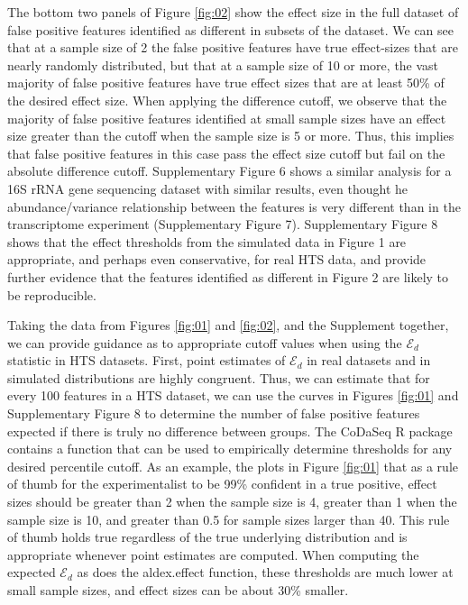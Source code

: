The bottom two panels of Figure \ref{fig:02} show the effect size in the full dataset of false positive features identified as different in subsets of the dataset. We can see that at a sample size of 2 the false positive features have true effect-sizes that are nearly randomly distributed, but that at a sample size of 10 or more, the vast majority of false positive features have true effect sizes that are at least 50\% of the desired effect size. When applying the difference cutoff, we observe that the majority of false positive features identified at small sample sizes have an effect size greater than the cutoff when the sample size is 5 or more. Thus, this implies that false positive features in this case pass the effect size cutoff but fail on the absolute difference cutoff. Supplementary Figure 6 shows a similar analysis for a 16S rRNA gene sequencing dataset \citep{bian:2017} with similar results, even thought he abundance/variance relationship between the features is very different than in the transcriptome experiment (Supplementary Figure 7). Supplementary Figure 8 shows that the effect thresholds from the simulated data in Figure 1 are appropriate, and perhaps even conservative, for real HTS data, and provide further evidence that the features identified as different in Figure 2 are likely to be reproducible.

Taking the data from Figures \ref{fig:01} and \ref{fig:02}, and the Supplement together, we can provide guidance as to appropriate cutoff values when using the $\mathcal{E}_{d} $ statistic in HTS datasets. First,  point estimates of $\mathcal{E}_{d} $ in real datasets and in simulated distributions are highly congruent. Thus, we can estimate that for every 100 features in a HTS dataset, we can use the curves in Figures \ref{fig:01} and  Supplementary Figure 8 to determine the number of false positive features expected if there is truly no difference between groups. The CoDaSeq R package contains a function that can be used to empirically determine thresholds for any desired percentile cutoff. As an example, the plots in Figure \ref{fig:01} that as a rule of thumb for the experimentalist to be 99\% confident in a true positive, effect sizes should be greater than 2 when the sample size is  4, greater than 1 when the sample size is 10, and greater than 0.5 for sample sizes larger than 40. This rule of thumb holds true regardless of the true underlying distribution and is appropriate whenever point estimates are computed. When computing the expected $\mathcal{E}_{d} $ as does the aldex.effect function, these thresholds are much lower at small sample sizes, and effect sizes can be about 30\% smaller. 

